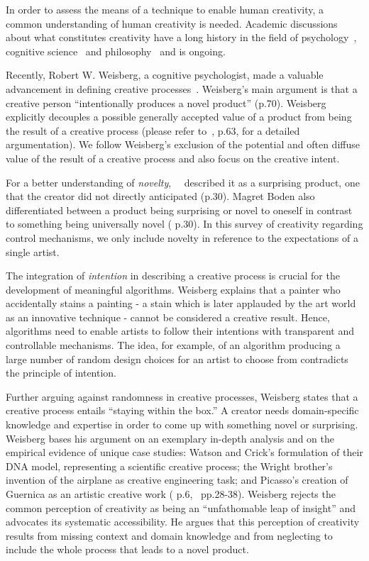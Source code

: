 In order to assess the means of a technique to enable human creativity, a common understanding of human creativity is needed. Academic discussions about what constitutes creativity have a long history in the field of psychology~\cite{weisberg_2006_cui}, cognitive science~\cite{boden_2004_cmm} and philosophy~\cite{gaut_2010_pc} and is ongoing. 

Recently, Robert W. Weisberg, a cognitive psychologist, made a valuable advancement in defining creative processes~\cite{weisberg_2006_cui}. Weisberg's main argument is that a creative person ``intentionally produces a novel product'' (p.70). Weisberg explicitly decouples a possible generally accepted value of a product from being the result of a creative process (please refer to~\cite{weisberg_2006_cui}, p.63, for a detailed argumentation). We follow Weisberg's exclusion of the potential and often diffuse value of the result of a creative process and also focus on the creative intent. 

For a better understanding of \textit{novelty},~\citeauthor*{boden_2010_cat}~\cite{boden_2010_cat} described it as a surprising product, one that the creator did not directly anticipated (p.30). Magret Boden also differentiated between a product being surprising or novel to oneself in contrast to something being universally novel (\cite{boden_2010_cat} p.30). In this survey of creativity regarding control mechanisms, we only include novelty in reference to the expectations of a single artist.

The integration of \textit{intention} in describing a creative process is crucial for the development of meaningful algorithms. Weisberg explains that a painter who accidentally stains a painting - a stain which is later applauded by the art world as an innovative technique - cannot be considered a creative result. Hence, algorithms need to enable artists to follow their intentions with transparent and controllable mechanisms. The idea, for example, of an algorithm producing a large number of random design choices for an artist to choose from contradicts the principle of intention.

Further arguing against randomness in creative processes, Weisberg states that a creative process entails ``staying within the box.'' A creator needs domain-specific knowledge and expertise in order to come up with something novel or surprising. Weisberg bases his argument on an exemplary in-depth analysis and on the empirical evidence of unique case studies: Watson and Crick's formulation of their DNA model, representing a scientific creative process; the Wright brother's invention of the airplane as creative engineering task; and Picasso's creation of Guernica as an artistic creative work (\cite{weisberg_2006_cui} p.6,~\cite{markman_2009_tis} pp.28-38). Weisberg rejects the common perception of creativity as being an ``unfathomable leap of insight'' and advocates its systematic accessibility. He argues that this perception of creativity results from missing context and domain knowledge and from neglecting to include the whole process that leads to a novel product.

